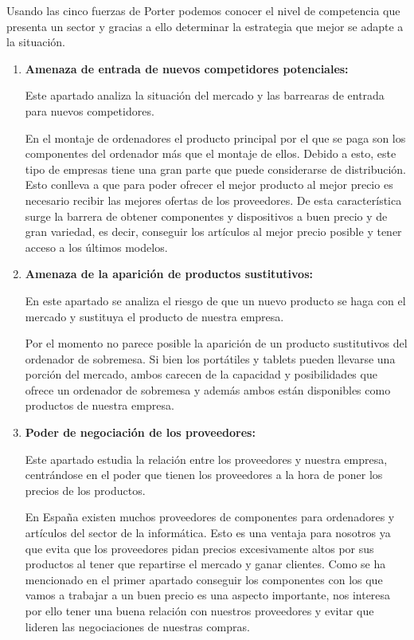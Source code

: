 Usando las cinco fuerzas de Porter podemos conocer el nivel de competencia que presenta un sector y gracias a ello determinar la estrategia que mejor se adapte a la situación. 

\begin{enumerate}
    \item \textbf{Amenaza de entrada de nuevos competidores potenciales:}
    
    Este apartado analiza la situación del mercado y las barrearas de entrada para nuevos competidores.

    En el montaje de ordenadores el producto principal por el que se paga son los componentes del ordenador más que el montaje de ellos. Debido a esto, este tipo de empresas tiene una gran parte que puede considerarse de distribución. Esto conlleva a que para poder ofrecer el mejor producto al mejor precio es necesario recibir las mejores ofertas de los proveedores. De esta característica surge la barrera de obtener componentes y dispositivos a buen precio y de gran variedad, es decir, conseguir los artículos al mejor precio posible y tener acceso a los últimos modelos.

    \item \textbf{Amenaza de la aparición de productos sustitutivos:}
    
    En este apartado se analiza el riesgo de que un nuevo producto se haga con el mercado y sustituya el producto de nuestra empresa.

    Por el momento no parece posible la aparición de un producto sustitutivos del ordenador de sobremesa. Si bien los portátiles y tablets pueden llevarse una porción del mercado, ambos carecen de la capacidad y posibilidades que ofrece un ordenador de sobremesa y además ambos están disponibles como productos de nuestra empresa.

    \item \textbf{Poder de negociación de los proveedores:}
    
    Este apartado estudia la relación entre los proveedores y nuestra empresa, centrándose en el poder que tienen los proveedores a la hora de poner los precios de los productos.

    En España existen muchos proveedores de componentes para ordenadores y artículos del sector de la informática. Esto es una ventaja para nosotros ya que evita que los proveedores pidan precios excesivamente altos por sus productos al tener que repartirse el mercado y ganar clientes. Como se ha mencionado en el primer apartado conseguir los componentes con los que vamos a trabajar a un buen precio es una aspecto importante, nos interesa por ello tener una buena relación con nuestros proveedores y evitar que lideren las negociaciones de nuestras compras.


\end{enumerate}
